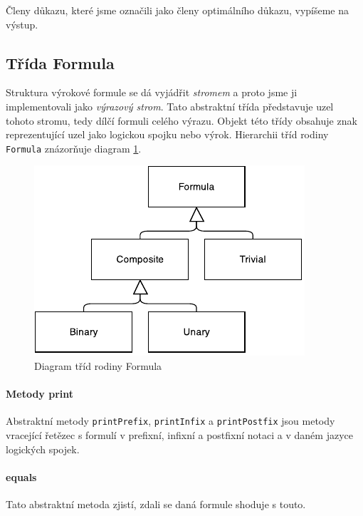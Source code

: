\documentclass[thesis=B,czech,hidelinks]{thesis}[2012/06/26]
\begin{document}
Členy důkazu, které jsme označili jako členy optimálního důkazu, vypíšeme na výstup.

\subsection{Třída Formula}

Struktura výrokové formule se dá vyjádřit \emph{stromem} a proto jsme ji implementovali jako \emph{výrazový strom}. Tato abstraktní třída představuje uzel tohoto stromu, tedy dílčí formuli celého výrazu. Objekt této třídy obsahuje znak reprezentující uzel jako logickou spojku nebo výrok. Hierarchii tříd rodiny \texttt{Formula} znázorňuje diagram \ref{fig:formula}.

\begin{figure}
\centering
\caption{Diagram tříd rodiny Formula}
\label{fig:formula}
\includegraphics[width=\linewidth]{diagrams/formula}
\end{figure}

\paragraph{Metody print}

Abstraktní metody \texttt{printPrefix}, \texttt{printInfix} a \texttt{printPostfix} jsou metody vracející řetězec s formulí v prefixní, infixní a postfixní notaci a v daném jazyce logických spojek.

\paragraph{equals}

Tato abstraktní metoda zjistí, zdali se daná formule shoduje s touto.
\end{document}
